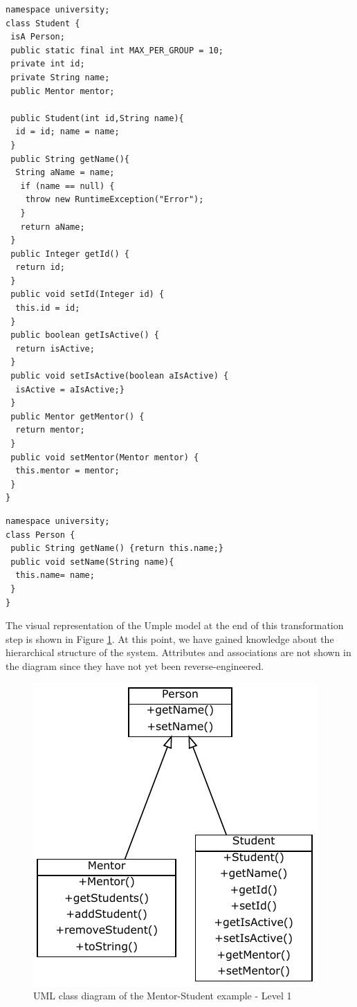 \begin{lstlisting}[style=UmpleIn,caption=Student.ump,label=lst:studentUmple0]
namespace university;
class Student {
 isA Person;
 public static final int MAX_PER_GROUP = 10; 
 private int id; 
 private String name;
 public Mentor mentor; 

 public Student(int id,String name){ 
  id = id; name = name; 
 } 
 public String getName(){
  String aName = name;
   if (name == null) { 
    throw new RuntimeException("Error");
   } 
   return aName; 
 }
 public Integer getId() {
  return id;
 }
 public void setId(Integer id) { 
  this.id = id; 
 } 
 public boolean getIsActive() { 
  return isActive;
 }
 public void setIsActive(boolean aIsActive) {
  isActive = aIsActive;} 
 }   
 public Mentor getMentor() { 
  return mentor; 
 }
 public void setMentor(Mentor mentor) { 
  this.mentor = mentor; 
 } 
}
\end{lstlisting}

\begin{lstlisting}[style=UmpleIn,caption=Person.ump,label=lst:personUmple0]
namespace university;
class Person { 
 public String getName() {return this.name;}
 public void setName(String name){
  this.name= name;
 }
}
\end{lstlisting}

The visual representation of the Umple model at the end of this transformation step is shown in Figure \ref{fig:Example1a1}. At this point, we have gained knowledge about the hierarchical structure of the system. Attributes and associations are not shown in the diagram since they have not yet been reverse-engineered.

\begin{figure}[h]
\centering
\includegraphics{Figures/Example1a1.pdf} 
\caption{UML class diagram of the Mentor-Student example - Level 1}
\label{fig:Example1a1}
\end{figure}

